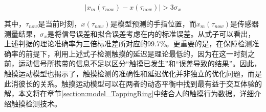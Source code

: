 \begin{equation}
	\lvert x_m(\tau_{now})-x(\tau_{now})\rvert>3\sigma_x
	\label{equ:touch_condition_intro}
\end{equation}

其中，$\tau_{now}$是当前时刻，$x(\tau_{now})$是模型预测的手指位置，而$x_m(\tau_{now})$是传感器测量结果，$\sigma_x$是将信号误差和拟合误差考虑在内的标准误差。从式子可以看出，上述判据的理论准确率为三倍标准差所对应的99.7\%。更重要的是，在保障检测准确率的前提下，利用上述式子检测触摸的延迟是理论最低的，因为在这一时刻之前，运动信号所携带的信息不足以区分“触摸已发生”和“误差导致的结果”。因此，触摸运动模型也揭示了，触摸检测的准确性和延迟优化并非独立的优化问题，而是此消彼长的关系。触摸运动模型可以在两者的动态平衡中找到最有益于交互体验的解，本文将在章节\ref{section:model_TappingRing}中结合人的触摸行为数据，详细介绍触摸检测技术。




